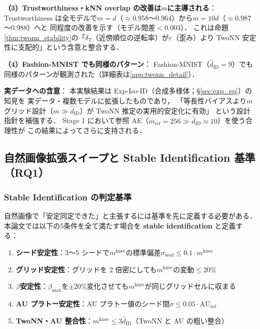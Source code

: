 \documentclass[11pt,a4paper]{jsarticle}
\newcommand{\AUsat}{\mathrm{AU}_{\mathrm{sat}}}
\newcommand{\mknee}{m^{\mathrm{knee}}}
\begin{document}
\textbf{（3）Trustworthiness・kNN overlap の改善は$m$に主導される}：
Trustworthiness は全モデルで$m=d$（$\approx 0.958$〜0.964）から$m=10d$（$\approx 0.987$〜0.988）へと
同程度の改善を示す（モデル間差$< 0.003$）．
これは命題\ref{thm:twonn_stability}の「$\delta_T$（近傍順位の逆転率）が$\varepsilon$（歪み）より
TwoNN 安定性に支配的」という含意と整合する．

\textbf{（4）Fashion-MNIST でも同様のパターン}：
Fashion-MNIST（$\hat{d}_\mathrm{ID}=9$）でも同様のパターンが観測された（詳細表は\ref{app:twonn_detail}）．

\textbf{実データへの含意}：
本実験結果は Exp-Iso-ID（合成多様体；§\ref{sec:exp_ep}）の知見を
実データ・複数モデルに拡張したものであり，
「等長性バイアスより$m$グリッド設計（$m \gg \hat{d}_\mathrm{ID}$）が TwoNN 推定の実用的安定化に有効」
という設計指針を補強する．
Stage 1 において参照 AE（$m_\mathrm{ref}=256 \gg \hat{d}_\mathrm{ID} \approx 10$）を使う合理性が
この結果によってさらに支持される．

\subsection{自然画像拡張スイープと Stable Identification 基準（RQ1）}\label{sec:exp_natimg_sweep}

\subsubsection*{Stable Identification の判定基準}\label{sec:natimg_stable_id}

自然画像で「安定同定できた」と主張するには基準を先に定義する必要がある．
本論文では以下の5条件を全て満たす場合を \textbf{stable identification} と定義する：

\begin{enumerate}
  \item \textbf{シード安定性}：3〜5 シードで$\mknee$の標準偏差$\sigma_\mathrm{seed} \leq 0.1 \cdot \mknee$
  \item \textbf{グリッド安定性}：グリッドを 2 倍密にしても$\mknee$の変動$\leq 20\%$
  \item \textbf{$\beta$安定性}：$\beta_{\max}$を$\pm 20\%$変化させても$\mknee$が同じグリッドセルに収まる
  \item \textbf{AU プラトー安定性}：AU プラトー値のシード間$\sigma \leq 0.05 \cdot \AUsat$
  \item \textbf{TwoNN・AU 整合性}：$\mknee \leq 3 \hat{d}_\mathrm{ID}$（TwoNN と AU の粗い整合）
\end{enumerate}
\end{document}
